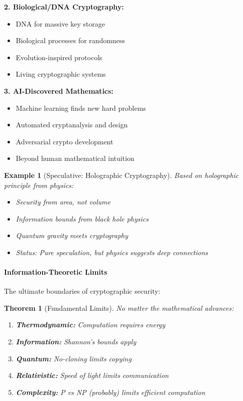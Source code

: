 \documentclass[11pt,a4paper]{article}
\newtheorem{theorem}{Theorem}
\newtheorem{example}{Example}
\begin{document}
\textbf{2. Biological/DNA Cryptography:}
\begin{itemize}
    \item DNA for massive key storage
    \item Biological processes for randomness
    \item Evolution-inspired protocols
    \item Living cryptographic systems
\end{itemize}

\textbf{3. AI-Discovered Mathematics:}
\begin{itemize}
    \item Machine learning finds new hard problems
    \item Automated cryptanalysis and design
    \item Adversarial crypto development
    \item Beyond human mathematical intuition
\end{itemize}

\begin{example}[Speculative: Holographic Cryptography]
Based on holographic principle from physics:
\begin{itemize}
    \item Security from area, not volume
    \item Information bounds from black hole physics
    \item Quantum gravity meets cryptography
    \item Status: Pure speculation, but physics suggests deep connections
\end{itemize}
\end{example}

\paragraph{Information-Theoretic Limits}

The ultimate boundaries of cryptographic security:

\begin{theorem}[Fundamental Limits]
No matter the mathematical advances:
\begin{enumerate}
    \item \textbf{Thermodynamic:} Computation requires energy
    \item \textbf{Information:} Shannon's bounds apply
    \item \textbf{Quantum:} No-cloning limits copying
    \item \textbf{Relativistic:} Speed of light limits communication
    \item \textbf{Complexity:} P vs NP (probably) limits efficient computation
\end{enumerate}
\end{theorem}
\end{document}

